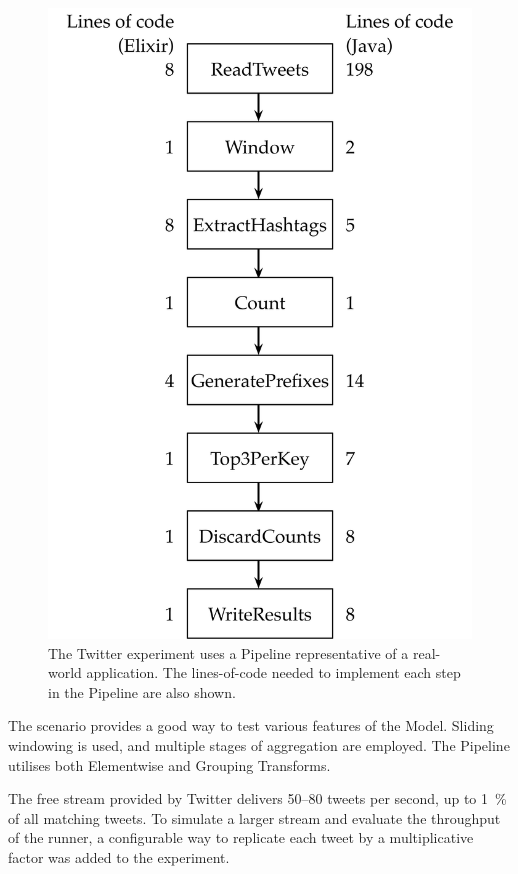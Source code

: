 \begin{figure}
	\centering
	\includegraphics[height=0.6\textheight]{images/diags/eval-twitter-pipeline}
	\caption[The Twitter Pipeline as a Directed Acyclic Graph.]{The Twitter experiment uses a Pipeline representative of a real-world application. The lines-of-code needed to implement each step in the Pipeline are also shown.}
	\label{fig:eval:twitter-pipeline-dag}
\end{figure}


The scenario provides a good way to test various features of the Model.
Sliding windowing is used, and multiple stages of aggregation are employed.
The Pipeline utilises both Elementwise and Grouping Transforms.

The free stream provided by Twitter delivers \num{50}--\num{80} tweets per second, up to \SI{1}{\percent} of all matching tweets.
To simulate a larger stream and evaluate the throughput of the runner, a configurable way to replicate each tweet by a multiplicative factor was added to the experiment.

